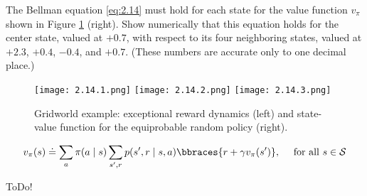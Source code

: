 
\begin{exercise}[Exercise 3.14]

The Bellman equation \eqref{eq:2.14} must hold for each state for the value function $v_\pi$ shown in Figure \ref{fig:2.14} (right). %
Show numerically that this equation holds for the center state, valued at $+0.7$, with respect to its four neighboring states, valued at $+2.3$, $+0.4$, $-0.4$, and $+0.7$.
(These numbers are accurate only to one decimal place.)

\begin{figure}[H]
    \centering
    \subfloat
    {
        \texttt{[image: 2.14.1.png]}
    }
    \hspace{1cm}
    \subfloat
    {
        \texttt{[image: 2.14.2.png]}
    }
    \hspace{1cm}
    \subfloat
    {
        \texttt{[image: 2.14.3.png]}
    }
    \hspace{0mm}
    \caption
    {
        Gridworld example:
        exceptional reward dynamics (left) and state-value function for the equiprobable random policy (right).
    }
    \label{fig:2.14}
\end{figure}

\begin{align} \label{eq:2.14}
    v_\pi(s)
    \doteq
    \sum_a
        \pi(a \mid s)
        \sum_{s^\prime, r}
            p(s^\prime, r \mid s, a)
            \bbraces{r + \gamma v_\pi(s^\prime)},
    \quad
    ~\text{for all}~ s \in \mathcal S
\end{align}

\end{exercise}


\begin{solution}

ToDo!

\end{solution}

